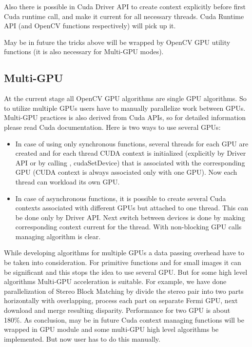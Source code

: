 Also there is possible in Cuda Driver API to create context explicitly before first Cuda runtime call, and make it current for all necessary threads. Cuda Runtime API (and OpenCV functions respectively) will pick up it.

May be in future the tricks above will be wrapped by OpenCV GPU utility functions (it is also necessary for Multi-GPU modes).

\subsection{Multi-GPU}

At the current stage all OpenCV GPU algorithms are single GPU algorithms. So to utilize multiple GPUs users have to manually parallelize work between GPUs. Multi-GPU practices is also derived from Cuda APIs, so for detailed information please read Cuda documentation. Here is two ways to use several GPUs:
\begin{itemize}
\item In case of using only synchronous functions, several threads for each GPU are created and for each thread CUDA context is initialized (explicitly by Driver API or by calling \newline {}, cudaSetDevice) that is associated with the corresponding GPU (CUDA context is always associated only with one GPU).  Now each thread can workload its own GPU.
\item In case of asynchronous functions, it is possible to create several Cuda contexts associated with different GPUs but attached to one thread. This can be done only by Driver API. Next switch between devices is done by making corresponding context current for the thread. With non-blocking GPU calls managing algorithm is clear.
\end{itemize}
While developing algorithms for multiple GPUs a data passing overhead have to be taken into consideration. For primitive functions and for small images it can be significant and this stops the idea to use several GPU. But for some high level algorithms Multi-GPU acceleration is suitable. For example, we have done parallelization of Stereo Block Matching by divide the stereo pair into two parts horizontally with overlapping, process each part on separate Fermi GPU, next download and merge resulting disparity. Performance for two GPU is about 180\%. As conclusion, may be in future Cuda context managing functions will be wrapped in GPU module and some multi-GPU high level algorithms be implemented. But now user has to do this manually.


